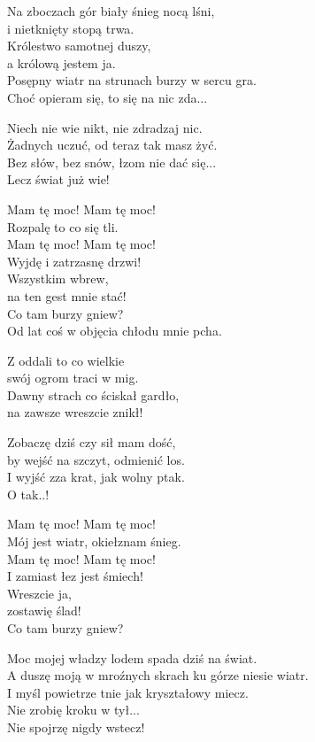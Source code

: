 \begin{text}
    Na zboczach gór biały śnieg nocą lśni,\\
    i nietknięty stopą trwa.\\
    Królestwo samotnej duszy,\\
    a królową jestem ja.\\
    Posępny wiatr na strunach burzy w sercu gra.\\
    Choć opieram się, to się na nic zda...

    Niech nie wie nikt, nie zdradzaj nic.\\
    Żadnych uczuć, od teraz tak masz żyć.\\
    Bez słów, bez snów, łzom nie dać się...\\
    Lecz świat już wie!

    Mam tę moc! Mam tę moc!\\
    Rozpalę to co się tli.\\
    Mam tę moc! Mam tę moc!\\
    Wyjdę i zatrzasnę drzwi!\\
    Wszystkim wbrew,\\
    na ten gest mnie stać!\\
    Co tam burzy gniew?\\
    Od lat coś w objęcia chłodu mnie pcha.

    Z oddali to co wielkie\\
    swój ogrom traci w mig.\\
    Dawny strach co ściskał gardło,\\
    na zawsze wreszcie znikł!

    Zobaczę dziś czy sił mam dość,\\
    by wejść na szczyt, odmienić los.\\
    I wyjść zza krat, jak wolny ptak.\\
    O tak..!

    Mam tę moc! Mam tę moc!\\
    Mój jest wiatr, okiełznam śnieg.\\
    Mam tę moc! Mam tę moc!\\
    I zamiast łez jest śmiech!\\
    Wreszcie ja,\\
    zostawię ślad!\\
    Co tam burzy gniew?

    Moc mojej władzy lodem spada dziś na świat.\\
    A duszę moją w mroźnych skrach ku górze niesie wiatr.\\
    I myśl powietrze tnie jak kryształowy miecz.\\
    Nie zrobię kroku w tył...\\
    Nie spojrzę nigdy wstecz!


\end{text}

